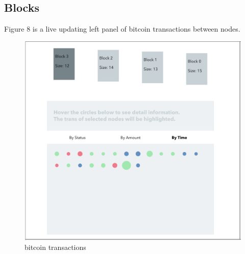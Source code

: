 \documentclass[journal, a4paper]{IEEEtran}
\begin{document}
\subsection{Blocks}
Figure 8 is a live updating left panel of bitcoin transactions between nodes.
\begin{figure}[!hbt]
		\begin{center}
		\includegraphics[width=\columnwidth]{blocks.png}
		\caption{bitcoin transactions}
		\label{fig:blocks}
		\end{center}
	\end{figure}
	
\end{document}
